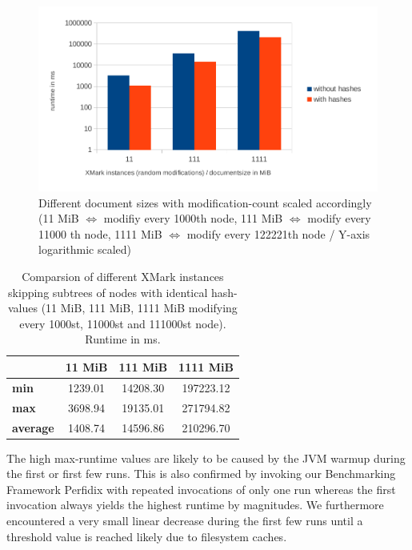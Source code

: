 \begin{figure}[tb]
\centering
\includegraphics[width=\textwidth]{figures/diff-docsize-scale-pruned}
\caption{Different document sizes with modification-count scaled accordingly (11 MiB $\Leftrightarrow$ modifiy every 1000th node, 111 MiB $\Leftrightarrow$ modify every 11000 th node, 1111 MiB $\Leftrightarrow$ modify every 122221th node / Y-axis logarithmic scaled)} 
\label{fig:docScaling}
\end{figure}

\begin{table}[tb]
\centering 
\begin{tabular}[r]{|l|c|c|c|} 
\hline
& \textbf{11 MiB} & \textbf{111 MiB} & \textbf{1111 MiB}\\
\hline
\hline
\textbf{min} & 1239.01 & 14208.30 & 197223.12\\
\hline
\textbf{max} & 3698.94 & 19135.01 & 271794.82\\
\hline
\textbf{average} & 1408.74 & 14596.86 & 210296.70\\
\hline
\end{tabular}
\label{chap3:compPrunedDiffInstances}
\vspace{0.5em} 
\caption{Comparsion of different XMark instances skipping subtrees of nodes with identical hash-values (11 MiB, 111 MiB, 1111 MiB modifying every 1000st, 11000st and 111000st node). Runtime in ms.}
\end{table}

The high max-runtime values are likely to be caused by the JVM warmup during the first or first few runs. This is also confirmed by invoking our Benchmarking Framework Perfidix with repeated invocations of only one run whereas the first invocation always yields the highest runtime by magnitudes. We furthermore encountered a very small linear decrease during the first few runs until a threshold value is reached likely due to filesystem caches.

